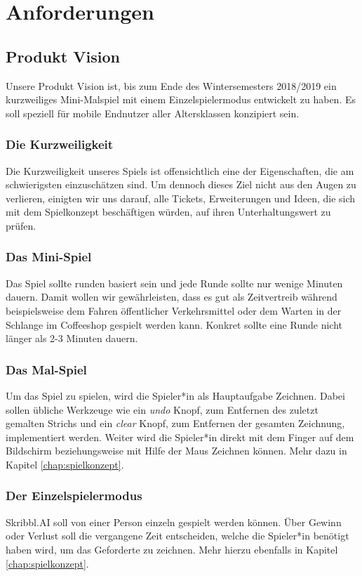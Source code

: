 \documentclass[11pt]{article}
\begin{document}
\section{Anforderungen}
\label{chap: Anforderungen}
\subsection{Produkt Vision}
\label{chap: productVision}
Unsere Produkt Vision ist, bis zum Ende des Wintersemesters 2018/2019 ein kurzweiliges Mini-Malspiel mit einem Einzelspielermodus entwickelt zu haben. Es soll speziell für mobile Endnutzer aller Altersklassen konzipiert sein.
\subsubsection{Die Kurzweiligkeit}
Die Kurzweiligkeit unseres Spiels ist offensichtlich eine der Eigenschaften, die am schwierigsten einzuschätzen sind. Um dennoch dieses Ziel nicht aus den Augen zu verlieren, einigten wir uns darauf, alle Tickets, Erweiterungen und Ideen, die sich mit dem Spielkonzept beschäftigen würden, auf ihren Unterhaltungswert zu prüfen.
\subsubsection{Das Mini-Spiel}
Das Spiel sollte runden basiert sein und jede Runde sollte nur wenige Minuten dauern. Damit wollen wir gewährleisten, dass es gut als Zeitvertreib während beispielsweise dem Fahren öffentlicher Verkehrsmittel oder dem Warten in der Schlange im Coffeeshop gespielt werden kann. Konkret sollte eine Runde nicht länger als 2-3 Minuten dauern.
\subsubsection{Das Mal-Spiel}
Um das Spiel zu spielen, wird die Spieler*in als Hauptaufgabe Zeichnen. Dabei sollen übliche Werkzeuge wie ein \textit{undo} Knopf, zum Entfernen des zuletzt gemalten Strichs und ein \textit{clear} Knopf, zum Entfernen der gesamten Zeichnung, implementiert werden. Weiter wird die Spieler*in direkt mit dem Finger auf dem Bildschirm beziehungsweise mit Hilfe der Maus Zeichnen können. Mehr dazu in Kapitel \ref{chap:spielkonzept}.
\subsubsection{Der Einzelspielermodus}
Skribbl.AI soll von einer Person einzeln gespielt werden können. Über Gewinn oder Verlust soll die vergangene Zeit entscheiden, welche die Spieler*in benötigt haben wird, um das Geforderte zu zeichnen. Mehr hierzu ebenfalls in Kapitel \ref{chap:spielkonzept}.
\end{document}
